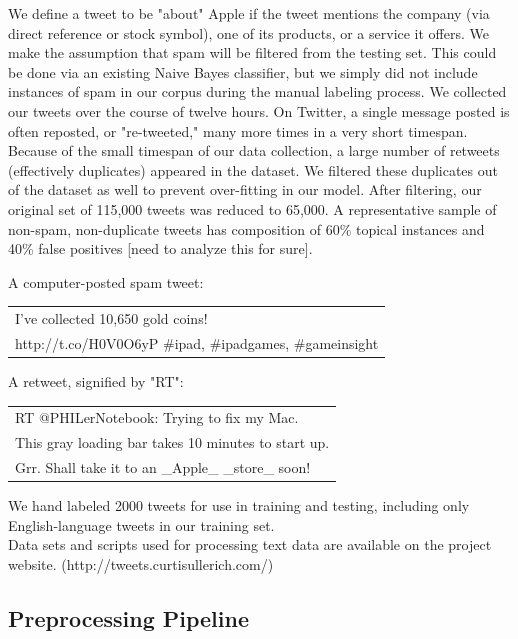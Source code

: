 \documentclass[letterpaper]{article}
\begin{document}
We define a tweet to be "about" Apple if the tweet mentions the company (via direct reference or stock symbol), one of its products, or a service it offers. We make the assumption that spam will be filtered from the testing set. This could be done via an existing Naive Bayes classifier, but we simply did not include instances of spam in our corpus during the manual labeling process. We collected our tweets over the course of twelve hours. On Twitter, a single message posted is often reposted, or "re-tweeted," many more times in a very short timespan. Because of the small timespan of our data collection, a large number of retweets (effectively duplicates) appeared in the dataset. We filtered these duplicates out of the dataset as well to prevent over-fitting in our model. After filtering, our original set of 115,000 tweets was reduced to 65,000. A representative sample of non-spam, non-duplicate tweets has composition of 60\% topical instances and 40\% false positives [need to analyze this for sure].

A computer-posted spam tweet:
\begin{table}[h]
\centering
\begin{tabular}{|l|}
	\hline
	I've collected 10,650 gold coins! \\ http://t.co/H0V0O6yP \#ipad, \#ipadgames, \#gameinsight\\
	\hline
\end{tabular}
\end{table}


A retweet, signified by "RT":
\begin{table}[h]
\centering
\begin{tabular}{|l|}
	\hline
	RT @PHILerNotebook: Trying to fix my Mac. \\ This gray loading bar takes 10 minutes to start up. \\ Grr. Shall take it to an \_Apple\_ \_store\_ soon! \\
	\hline
\end{tabular}
\end{table}

We hand labeled 2000 tweets for use in training and testing, including only English-language tweets in our training set. \\
Data sets and scripts used for processing text data are available on the project website. (http://tweets.curtisullerich.com/)\\

\subsection{Preprocessing Pipeline}
\end{document}
